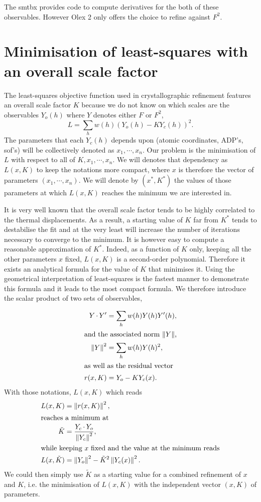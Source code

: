 \documentclass[pdf]{iucr}
\begin{document}
The smtbx provides code to compute derivatives for the both of these observables. However Olex 2 only offers the choice to refine against $F^2$.

\section{Minimisation of least-squares with an overall scale factor}
\label{appendix:leastsquaresminimisation}

The least-squares objective function used in crystallographic refinement features an overall scale factor $K$ because we do not know on which scales are the observables $Y_o(h)$ where $Y$ denotes either $F$ or $F^2$,
\begin{equation}
L = \sum_h w(h) (Y_o(h) - K Y_c(h))^2.
\end{equation}
The parameters that each $Y_c(h)$ depends upon (atomic coordinates, ADP's, sof's) will be collectively denoted as $x_1, \cdots, x_n$. Our problem is the minimisation of $L$ with respect to all of $K, x_1, \cdots, x_n$. We will  denotes that dependency as $L(x, K)$ to keep the notations more compact, where $x$ is therefore the vector of parameters $(x_1, \cdots, x_n)$. We will denote by $(x^*, K^*)$ the values of those parameters at which $L(x,K)$ reaches the minimum we are interested in.

It is very well known that the overall scale factor tends to be highly correlated to the thermal displacements. As a result, a starting value of $K$ far from $K^*$ tends to destabilise the fit and at the very least will increase the number of iterations necessary to converge to the minimum. It is however easy to compute a reasonable approximation of $K^*$. Indeed, as a function of $K$ only, keeping all the other parameters $x$ fixed, $L(x, K)$ is a second-order polynomial. Therefore it exists an analytical formula for the value of $K$ that minimises it. Using the geometrical interpretation of least-squares is the fastest manner to demonstrate this formula and it leads to the most compact formula. We therefore introduce the scalar product of two sets of observables,

\begin{align}
Y \operatorname{\cdot} Y' &= \sum_h w(h) Y(h) Y'(h), \\
\intertext{and the associated norm $\left\| Y \right\|$,}
\left\| Y \right\|^2 &= \sum_h w(h) Y(h)^2, \\
\intertext{as well as the residual vector}
r(x, K) &= Y_o - K Y_c(x).
\label{eqn:lsresidualdef}
\end{align}
With those notations, $L(x, K)$ which reads
\begin{align}
L(x, K) &= \left\| r(x, K) \right\|^2, \\
\intertext{reaches a minimum at}
\tilde{K} &= \frac{Y_c \operatorname{\cdot} Y_o}{\left\| Y_c \right\|^2},
\label{eqn:tildeK}
\\
\intertext{while keeping $x$ fixed and the value at the minimum reads}
L(x, \tilde{K}) &= \left\| Y_o \right\|^2 - \tilde{K}^2 \left\| Y_c(x) \right\|^2.
\end{align}
We could then simply use $\tilde{K}$ as a starting value for a combined refinement of $x$ and $K$, i.e. the minimisation of $L(x, K)$ with the independent vector $(x, K)$ of parameters.
\end{document}
